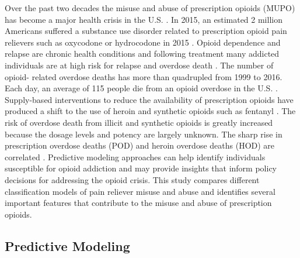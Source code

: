 \documentclass[sigconf]{acmart}
\begin{document}
Over the past two decades the misuse and abuse of prescription opioids (MUPO)  
has become a major health crisis in the U.S. \cite{volkow14}. In 2015, an 
estimated 2 million Americans suffered a substance use disorder related 
to prescription opioid pain relievers such as oxycodone or hydrocodone 
in 2015 \cite{nida18}. Opioid dependence and relapse are chronic health 
conditions and following treatment many addicted individuals are at high 
risk for relapse and overdose death \cite{shaham03}. The number of opioid-
related overdose deaths has more than quadrupled from 1999 to 2016. 
Each day, an average of 115 people die from an opioid overdose in the U.S. 
\cite{cdc18, judd16}. Supply-based interventions to reduce the availability 
of prescription opioids have produced a shift to the use of heroin and 
synthetic opioids such as fentanyl \cite{jones15}. The risk of overdose 
death from illicit and synthetic opioids is greatly increased because 
the dosage levels and potency are largely unknown. The sharp rise in 
prescription overdose deaths (POD) and heroin overdose deaths (HOD) are 
correlated \cite{muhuri13, unick13}. Predictive modeling approaches can 
help identify individuals susceptible for opioid addiction and may provide 
insights that inform policy decisions for addressing the opioid crisis. 
This study compares different classification models of pain reliever misuse 
and abuse and identifies several important features that contribute to 
the misuse and abuse of prescription opioids. 


\subsection{Predictive Modeling}
\end{document}

